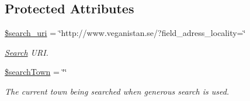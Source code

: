 \subsection*{Protected Attributes}
\begin{DoxyCompactItemize}
\item 
\hyperlink{class_search_adbc71d7a9ff28a661af822ca70dfeefa}{\$search\+\_\+uri} = \char`\"{}http\+://www.\+veganistan.\+se/?field\+\_\+adress\+\_\+locality=\char`\"{}
\begin{DoxyCompactList}\small\item\em \hyperlink{class_search}{Search} U\+R\+I. \end{DoxyCompactList}\item 
\hyperlink{class_search_a0bdf2816de59f8db308bc03285152358}{\$search\+Town} = \char`\"{}\char`\"{}
\begin{DoxyCompactList}\small\item\em The current town being searched when generous search is used. \end{DoxyCompactList}\end{DoxyCompactItemize}
